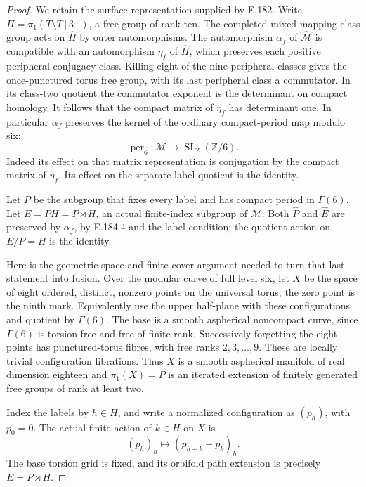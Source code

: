 \begin{proof}
We retain the surface representation supplied by E.182.
Write \(\Pi=\pi_1(T\setminus T[3])\), a free group of rank ten.
The completed mixed mapping class group acts on
\(\widehat\Pi\) by outer automorphisms.  The automorphism
\(\alpha_f\) of \(\widehat{\mathcal M}\) is compatible with
an automorphism \(\eta_f\) of \(\widehat\Pi\), which preserves
each positive peripheral conjugacy class.  Killing eight
of the nine peripheral classes gives the once-punctured
torus free group, with its last peripheral class a
commutator.  In its class-two quotient the commutator
exponent is the determinant on compact homology.
It follows that the compact matrix of \(\eta_f\) has
determinant one.  In particular \(\alpha_f\) preserves
the kernel of the ordinary compact-period map modulo six:
\[
 \operatorname{per}_6:\mathcal M
              \longrightarrow\operatorname{SL}_2(\mathbb Z/6).
\tag{E.184.4}
\]
Indeed its effect on that matrix representation is
conjugation by the compact matrix of \(\eta_f\).
Its effect on the separate label quotient is the identity.

Let \(P\) be the subgroup that fixes every label and has
compact period in \(\Gamma(6)\).  Let
\(E=P H=P\rtimes H\), an actual finite-index subgroup of
\(\mathcal M\).  Both \(\widehat P\) and \(\widehat E\)
are preserved by \(\alpha_f\), by E.184.4 and the label
condition; the quotient action on \(E/P=H\) is the identity.

Here is the geometric space and finite-cover argument needed
to turn that last statement into fusion.  Over the modular
curve of full level six, let \(X\) be the space of eight
ordered, distinct, nonzero points on the universal torus;
the zero point is the ninth mark.  Equivalently use the
upper half-plane with these configurations and quotient by
\(\Gamma(6)\).  The base is a smooth aspherical noncompact
curve, since \(\Gamma(6)\) is torsion free and free of
finite rank.  Successively forgetting the eight points
has punctured-torus fibres, with free ranks
\(2,3,\ldots,9\).  These are locally trivial configuration
fibrations.  Thus \(X\) is a smooth aspherical manifold
of real dimension eighteen and \(\pi_1(X)=P\) is an
iterated extension of finitely generated free groups of
rank at least two.

Index the labels by \(h\in H\), and write a normalized
configuration as \((p_h)\), with \(p_0=0\).
The actual finite action of \(k\in H\) on \(X\) is
\[
                   (p_h)_h\longmapsto(p_{h+k}-p_k)_h.
\tag{E.184.5}
\]
The base torsion grid is fixed, and its orbifold path
extension is precisely \(E=P\rtimes H\).


\end{proof}
